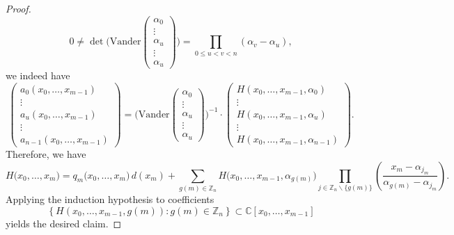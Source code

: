\begin{proof}
\begin{equation}
0\ne\det\bigg(\text{Vander}\left(\begin{array}{c}
\alpha_{0}\\
\vdots\\
\alpha_{u}\\
\vdots\\
\alpha_{u}
\end{array}\right)\bigg)=\prod_{0\le u<v<n}(\alpha_{v}-\alpha_{u}),
 \end{equation}
we indeed have 
\begin{equation}
\left(\begin{array}{c}
a_{0}\left(x_{0},\ldots,x_{m-1}\right)\\
\vdots\\
a_{u}\left(x_{0},\ldots,x_{m-1}\right)\\
\vdots\\
a_{n-1}\left(x_{0},\ldots,x_{m-1}\right)
\end{array}\right)=\bigg(\text{Vander}\left(\begin{array}{c}
\alpha_{0}\\
\vdots\\
\alpha_{u}\\
\vdots\\
\alpha_{u}
\end{array}\right)\bigg)^{-1}\cdot\left(\begin{array}{c}
H(x_{0},\ldots,x_{m-1},\alpha_{0})\\
\vdots\\
H(x_{0},\ldots,x_{m-1},\alpha_{u})\\
\vdots\\
H(x_{0},\ldots,x_{m-1},\alpha_{n-1})
\end{array}\right).
\end{equation}
Therefore, we have 
\begin{equation}
H\big(x_{0},\ldots,x_{m}\big)
= q_{m}\big(x_{0},\ldots,x_{m}\big)\,d(x_{m})+\sum_{g(m)\in\mathbb{Z}_{n}}H\big(x_{0},\ldots,x_{m-1},\alpha_{g(m)}\big)\prod_{j\in\mathbb{Z}_{n}\backslash\{g(m)\}}\left(\frac{x_{m}-\alpha_{j_{m}}}{\alpha_{g(m)}-\alpha_{j_{m}}}\right).
\end{equation}
Applying the induction hypothesis to coefficients
\[
\left\{ H\left(x_{0},\ldots,x_{m-1},g\left(m\right)\right):g\left(m\right)\in\mathbb{Z}_{n}\right\} \subset\mathbb{C}[x_{0},\ldots,x_{m-1}]
\]
yields the desired claim.
\end{proof}
